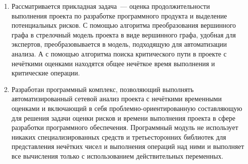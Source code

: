 \begin{enumerate}
  \item Рассматривается прикладная задача~--- оценка продолжительности выполнения проекта по разработке программного продукта и выделение потенциальных рисков. С помощью алгоритма преобразования вершинного графа в стрелочный модель проекта в виде вершинного графа, удобная для экспертов, преобразовывается в модель, подходящую для автоматизации анализа. А с помощью алгоритма поиска критического пути в проекте с нечёткими оценками находятся общее нечёткое время выполнения и критические операции.
  \item Разработан программный комплекс, позволяющий выполнять автоматизированный сетевой анализ проекта с нечёткими временными оценками и включающий в себя проблемно-ориентированную составляющую для решения задачи оценки рисков и времени выполнения проекта в сфере разработки программного обеспечения. Программный модуль не использует никаких специализированных средств и третьесторонних библиотек для представления нечётких чисел и выполнения операций над ними и выполняет все вычисления только с использованием действительных переменных.
\end{enumerate}